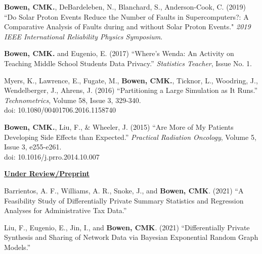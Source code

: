 \documentclass[11pt, letterpaper, roman]{moderncv} %
\begin{document}
\begin{etaremune}[topsep=0pt, itemsep=6pt, partopsep=0pt, parsep=0pt]
    \item \textbf{Bowen, CMK.}, DeBardeleben, N., Blanchard, S., Anderson-Cook, C. (2019) ``Do Solar Proton Events Reduce the Number of Faults in Supercomputers?: A Comparative Analysis of Faults during and without Solar Proton Events." \textit{2019 IEEE International Reliability Physics Symposium}.

    \item \textbf{Bowen, CMK.} and Eugenio, E. (2017) ``Where's Wenda:  An Activity on Teaching Middle School Students Data Privacy.'' \textit{Statistics Teacher}, Issue No. 1.
    
    \item Myers, K., Lawrence, E., Fugate, M., \textbf{Bowen, CMK.}, Ticknor, L., Woodring, J., Wendelberger, J., Ahrens, J. (2016) ``Partitioning a Large Simulation as It Runs.'' \textit{Technometrics}, Volume 58, Issue 3, 329-340. \\
    doi: 10.1080/00401706.2016.1158740

    \item \textbf{Bowen, CMK.}, Liu, F., \& Wheeler, J. (2015) ``Are More of My Patients Developing Side Effects than Expected.'' \textit{Practical Radiation Oncology}, Volume 5, Issue 3, e255-e261.\\
    doi: 10.1016/j.prro.2014.10.007
\end{etaremune}

\newpage
\noindent\underline{\textbf{Under Review/Preprint}}
\begin{etaremune}[topsep=0pt, itemsep=6pt, partopsep=0pt, parsep=0pt]
    \item Barrientos, A. F., Williams, A. R., Snoke, J., and \textbf{Bowen, CMK}. (2021) ``A Feasibility Study of Differentially Private Summary Statistics and Regression Analyses for Administrative Tax Data.''
    
    \item Liu, F., Eugenio, E., Jin, I., and \textbf{Bowen, CMK}. (2021) ``Differentially Private Synthesis and Sharing of Network Data via Bayesian Exponential Random Graph Models.''
\end{etaremune}
\end{document}
